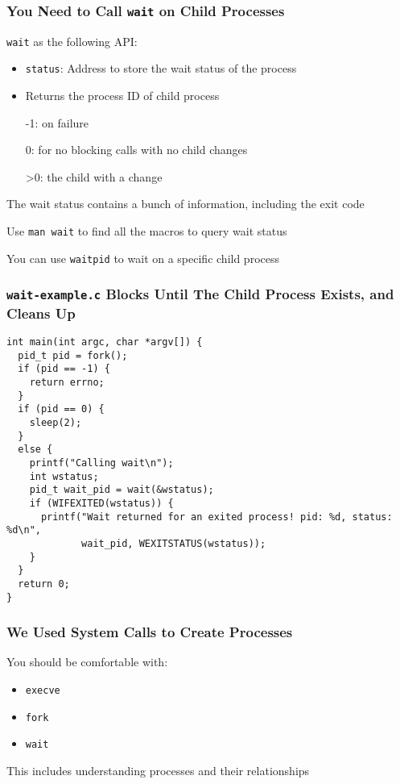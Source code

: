   \begin{frame}
    \frametitle{You Need to Call \texttt{wait} on Child Processes}

    \texttt{wait} as the following API:
    \begin{itemize}
      \item \texttt{status}: Address to store the wait status of the process
      \item Returns the process ID of child process

            \hspace{2em} -1: on failure

            \hspace{2em} 0: for no blocking calls with no child changes

            \hspace{2em} >0: the child with a change
    \end{itemize}

    \vspace{2em}

    The wait status contains a bunch of information, including the exit code

    \hspace{2em} Use \texttt{man wait} to find all the macros to query wait status

    \hspace{4em} You can use \texttt{waitpid} to wait on a specific child process
  \end{frame}

  \begin{frame}[fragile]
    \frametitle{\texttt{wait-example.c} Blocks Until The Child Process Exists, and Cleans Up}

    \begin{lstlisting}
int main(int argc, char *argv[]) {
  pid_t pid = fork();
  if (pid == -1) {
    return errno;
  }
  if (pid == 0) {
    sleep(2);
  }
  else {
    printf("Calling wait\n");
    int wstatus;
    pid_t wait_pid = wait(&wstatus);
    if (WIFEXITED(wstatus)) {
      printf("Wait returned for an exited process! pid: %d, status: %d\n",
             wait_pid, WEXITSTATUS(wstatus));
    }
  }
  return 0;
}
    \end{lstlisting}
  \end{frame}

  \begin{frame}
    \frametitle{We Used System Calls to Create Processes}

    You should be comfortable with:
    \begin{itemize}
      \item \texttt{execve}
      \item \texttt{fork}
      \item \texttt{wait}
    \end{itemize}

    \vspace{2em}

    This includes understanding processes and their relationships
  \end{frame}

